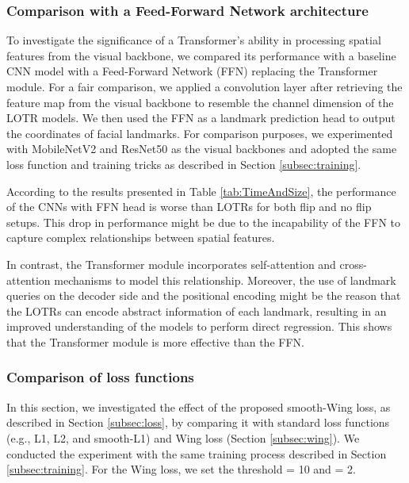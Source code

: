 \documentclass[journal]{IEEEtran}
\begin{document}
\subsubsection{Comparison with a Feed-Forward Network architecture}\label{subsubsec:ablation_mlp}

To investigate the significance of a Transformer's ability in processing spatial features from the visual backbone, we compared its performance with a baseline CNN model with a Feed-Forward Network (FFN) replacing the Transformer module.
For a fair comparison, we applied a  convolution layer after retrieving the feature map from the visual backbone to resemble the channel dimension of the LOTR models.
We then used the FFN as a landmark prediction head to output the coordinates of facial landmarks. 
For comparison purposes, we experimented with MobileNetV2 and ResNet50 as the visual backbones and adopted the same loss function and training tricks as described in Section \ref{subsec:training}.

According to the results presented in Table \ref{tab:TimeAndSize}, the performance of the CNNs with FFN head is worse than LOTRs for both flip and no flip setups.
This drop in performance might be due to the incapability of the FFN to capture complex relationships between spatial features.

In contrast, the Transformer module incorporates self-attention and cross-attention mechanisms to model this relationship.
Moreover, the use of landmark queries on the decoder side and the positional encoding might be the reason that the LOTRs can encode abstract information of each landmark, resulting in an improved understanding of the models to perform direct regression.
This shows that the Transformer module is more effective than the FFN.



\subsubsection{Comparison of loss functions}\label{subsubsec:ablation_loss}

In this section, we investigated the effect of the proposed smooth-Wing loss, as described in Section \ref{subsec:loss}, by comparing it with standard loss functions (e.g., L1, L2, and smooth-L1) and Wing loss (Section \ref{subsec:wing}).
We conducted the experiment with the same training process described in Section \ref{subsec:training}.
For the Wing loss, we set the threshold  = 10 and  = 2.
\end{document}
